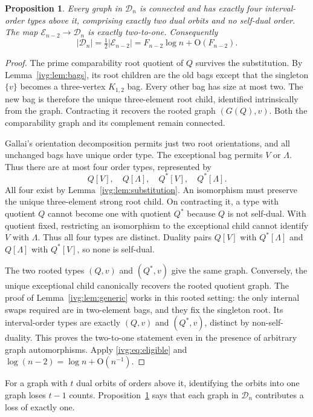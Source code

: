 \documentclass[11pt,letterpaper]{article}
\newtheorem{proposition}[theorem]{Proposition}
\theoremstyle{definition}\newtheorem{definition}[theorem]{Definition}
\theoremstyle{remark}\newtheorem{remark}[theorem]{Remark}
\newcommand{\OO}{\mathrm O}
\begin{document}
\begin{proposition}\label{ivg:prop:dominant}
Every graph in $\mathcal D_n$ is connected and has exactly four interval-order types above it, comprising exactly two dual orbits and no self-dual order. The map $\mathcal E_{n-2}\to\mathcal D_n$ is exactly two-to-one. Consequently
\begin{equation}\label{ivg:eq:dominant}
 |\mathcal D_n|=\tfrac12|\mathcal E_{n-2}|
 =F_{n-2}\log n+\OO(F_{n-2}).
\end{equation}
\end{proposition}
\begin{proof}
The prime comparability root quotient of $Q$ survives the substitution. By Lemma~\ref{ivg:lem:bags}, its root children are the old bags except that the singleton $\{v\}$ becomes a three-vertex $K_{1,2}$ bag. Every other bag has size at most two. The new bag is therefore the unique three-element root child, identified intrinsically from the graph. Contracting it recovers the rooted graph $(G(Q),v)$. Both the comparability graph and its complement remain connected.

Gallai's orientation decomposition permits just two root orientations, and all unchanged bags have unique order type. The exceptional bag permits $V$ or $\Lambda$. Thus there are at most four order types, represented by
\[
 Q[V],\quad Q[\Lambda],\quad Q^*[V],\quad Q^*[\Lambda].
\]
All four exist by Lemma~\ref{ivg:lem:substitution}. An isomorphism must preserve the unique three-element strong root child. On contracting it, a type with quotient $Q$ cannot become one with quotient $Q^*$ because $Q$ is not self-dual. With quotient fixed, restricting an isomorphism to the exceptional child cannot identify $V$ with $\Lambda$. Thus all four types are distinct. Duality pairs $Q[V]$ with $Q^*[\Lambda]$ and $Q[\Lambda]$ with $Q^*[V]$, so none is self-dual.

The two rooted types $(Q,v)$ and $(Q^*,v)$ give the same graph. Conversely, the unique exceptional child canonically recovers the rooted quotient graph. The proof of Lemma~\ref{ivg:lem:generic} works in this rooted setting: the only internal swaps required are in two-element bags, and they fix the singleton root. Its interval-order types are exactly $(Q,v)$ and $(Q^*,v)$, distinct by non-self-duality. This proves the two-to-one statement even in the presence of arbitrary graph automorphisms. Apply \eqref{ivg:eq:eligible} and $\log(n-2)=\log n+\OO(n^{-1})$.
\end{proof}
For a graph with $t$ dual orbits of orders above it, identifying the orbits into one graph loses $t-1$ counts. Proposition~\ref{ivg:prop:dominant} says that each graph in $\mathcal D_n$ contributes a loss of exactly one.
\end{document}
